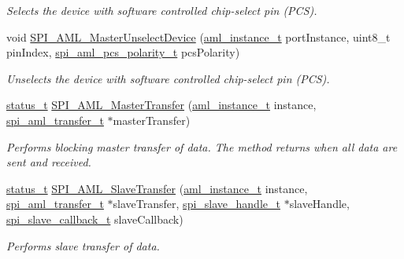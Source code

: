 \begin{DoxyCompactItemize}
\begin{DoxyCompactList}\small\item\em Selects the device with software controlled chip-\/select pin (P\+CS). \end{DoxyCompactList}\item 
void \mbox{\hyperlink{group__function__group_gacef541f53ec06c7151d8c6f148d4b365}{S\+P\+I\+\_\+\+A\+M\+L\+\_\+\+Master\+Unselect\+Device}} (\mbox{\hyperlink{common__aml_8h_a562bd37c7d07adcedec5993bc0cd96e5}{aml\+\_\+instance\+\_\+t}} port\+Instance, uint8\+\_\+t pin\+Index, \mbox{\hyperlink{group__enum__group_ga376ab165389ceb9a6e3f763263ff7e06}{spi\+\_\+aml\+\_\+pcs\+\_\+polarity\+\_\+t}} pcs\+Polarity)
\begin{DoxyCompactList}\small\item\em Unselects the device with software controlled chip-\/select pin (P\+CS). \end{DoxyCompactList}\item 
\mbox{\hyperlink{group__ksdk__common_gaaabdaf7ee58ca7269bd4bf24efcde092}{status\+\_\+t}} \mbox{\hyperlink{group__function__group_ga9f4ba74d2bab05187f915b58d3bece4d}{S\+P\+I\+\_\+\+A\+M\+L\+\_\+\+Master\+Transfer}} (\mbox{\hyperlink{common__aml_8h_a562bd37c7d07adcedec5993bc0cd96e5}{aml\+\_\+instance\+\_\+t}} instance, \mbox{\hyperlink{structspi__aml__transfer__t}{spi\+\_\+aml\+\_\+transfer\+\_\+t}} $\ast$master\+Transfer)
\begin{DoxyCompactList}\small\item\em Performs blocking master transfer of data. The method returns when all data are sent and received. \end{DoxyCompactList}\item 
\mbox{\hyperlink{group__ksdk__common_gaaabdaf7ee58ca7269bd4bf24efcde092}{status\+\_\+t}} \mbox{\hyperlink{group__function__group_gaabf878120f5f9da678aeb8885bb5af20}{S\+P\+I\+\_\+\+A\+M\+L\+\_\+\+Slave\+Transfer}} (\mbox{\hyperlink{common__aml_8h_a562bd37c7d07adcedec5993bc0cd96e5}{aml\+\_\+instance\+\_\+t}} instance, \mbox{\hyperlink{structspi__aml__transfer__t}{spi\+\_\+aml\+\_\+transfer\+\_\+t}} $\ast$slave\+Transfer, \mbox{\hyperlink{group__spi__driver_gad267cfee3a876b2860217ff94f03f574}{spi\+\_\+slave\+\_\+handle\+\_\+t}} $\ast$slave\+Handle, \mbox{\hyperlink{group__spi__driver_ga13fbc3110c56c1d312e4a5ebed07d679}{spi\+\_\+slave\+\_\+callback\+\_\+t}} slave\+Callback)
\begin{DoxyCompactList}\small\item\em Performs slave transfer of data. \end{DoxyCompactList}\item 

\end{DoxyCompactItemize}
